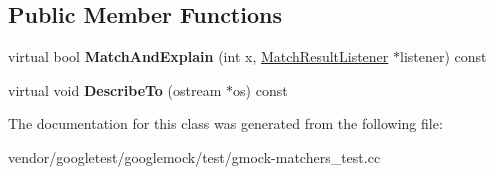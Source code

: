 \subsection*{Public Member Functions}
\begin{DoxyCompactItemize}
\item 
\mbox{\label{classtesting_1_1gmock__matchers__test_1_1_new_even_matcher_impl_a56819af55d88569fdfaa51b937f76337}} 
virtual bool {\bfseries Match\+And\+Explain} (int x, \hyperlink{classtesting_1_1_match_result_listener}{Match\+Result\+Listener} $\ast$listener) const
\item 
\mbox{\label{classtesting_1_1gmock__matchers__test_1_1_new_even_matcher_impl_aece368c865501da4b30620d06a2690cd}} 
virtual void {\bfseries Describe\+To} (ostream $\ast$os) const
\end{DoxyCompactItemize}


The documentation for this class was generated from the following file\+:\begin{DoxyCompactItemize}
\item 
vendor/googletest/googlemock/test/gmock-\/matchers\+\_\+test.\+cc\end{DoxyCompactItemize}

